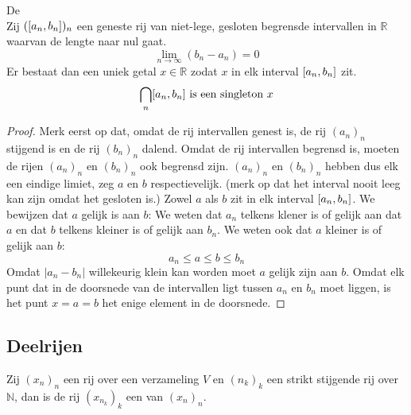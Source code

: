 \documentclass[main.tex]{subfiles}
\begin{document}
\begin{st}
  \label{st:geneste-intervallen}
  De \\
  Zij $(\interval{a_{n}}{b_{n}})_{n}$ een geneste rij van niet-lege, gesloten begrensde intervallen in $\mathbb{R}$ waarvan de lengte naar nul gaat.
  \[ \lim_{n \rightarrow \infty}(b_{n}-a_{n}) = 0 \]
  Er bestaat dan een uniek getal $x\in \mathbb{R}$ zodat $x$ in elk interval $\interval{a_{n}}{b_{n}}$ zit.
  \[ \bigcap_{n}\interval{a_{n}}{b_{n}} \text{ is een singleton } x \]

  \begin{proof}
    Merk eerst op dat, omdat de rij intervallen genest is, de rij $(a_{n})_{n}$ stijgend is en de rij $(b_{n})_{n}$ dalend.
    Omdat de rij intervallen begrensd is, moeten de rijen $(a_{n})_{n}$ en $(b_{n})_{n}$ ook begrensd zijn.
    $(a_{n})_{n}$ en $(b_{n})_{n}$ hebben dus elk een eindige limiet, zeg $a$ en $b$ respectievelijk.
    (merk op dat het interval nooit leeg kan zijn omdat het gesloten is.)
    Zowel $a$ als $b$ zit in elk interval $\interval{a_{n}}{b_{n}}$.
    We bewijzen dat $a$ gelijk is aan $b$:
    We weten dat $a_{n}$ telkens klener is of gelijk aan dat $a$ en dat $b$ telkens kleiner is of gelijk aan $b_{n}$.
    We weten ook dat $a$ kleiner is of gelijk aan $b$:
    \[ a_{n} \le a \le b \le b_{n} \]
    Omdat $|a_{n}-b_{n}|$ willekeurig klein kan worden moet $a$ gelijk zijn aan $b$.
    Omdat elk punt dat in de doorsnede van de intervallen ligt tussen $a_{n}$ en $b_{n}$ moet liggen, is het punt $x=a=b$ het enige element in de doorsnede.
  \end{proof}
\end{st}


\subsection{Deelrijen}
\label{sec:deelrijen}

\begin{de}
  Zij $(x_{n})_{n}$ een rij over een verzameling $V$ en $(n_{k})_{k}$ een strikt stijgende rij over $\mathbb{N}$, dan is de rij $(x_{n_{k}})_{k}$ een  van $(x_{n})_{n}$.
\end{de}
\end{document}
